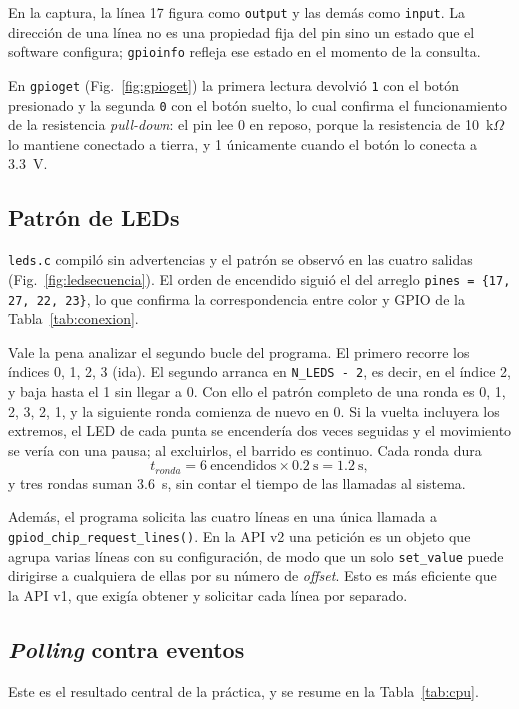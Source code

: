 \documentclass[conference]{IEEEtran}
\begin{document}
En la captura, la línea 17 figura como \texttt{output} y las demás como \texttt{input}. La dirección de una línea no es una propiedad fija del pin sino un estado que el software configura; \texttt{gpioinfo} refleja ese estado en el momento de la consulta.

En \texttt{gpioget} (Fig.~\ref{fig:gpioget}) la primera lectura devolvió \texttt{1} con el botón presionado y la segunda \texttt{0} con el botón suelto, lo cual confirma el funcionamiento de la resistencia \textit{pull-down}: el pin lee 0 en reposo, porque la resistencia de 10~k$\Omega$ lo mantiene conectado a tierra, y 1 únicamente cuando el botón lo conecta a 3.3~V.

\subsection{Patrón de LEDs}
\texttt{leds.c} compiló sin advertencias y el patrón se observó en las cuatro salidas (Fig.~\ref{fig:ledsecuencia}). El orden de encendido siguió el del arreglo \texttt{pines = \{17, 27, 22, 23\}}, lo que confirma la correspondencia entre color y GPIO de la Tabla~\ref{tab:conexion}.

Vale la pena analizar el segundo bucle del programa. El primero recorre los índices 0, 1, 2, 3 (ida). El segundo arranca en \texttt{N\_LEDS - 2}, es decir, en el índice 2, y baja hasta el 1 sin llegar a 0. Con ello el patrón completo de una ronda es 0, 1, 2, 3, 2, 1, y la siguiente ronda comienza de nuevo en 0. Si la vuelta incluyera los extremos, el LED de cada punta se encendería dos veces seguidas y el movimiento se vería con una pausa; al excluirlos, el barrido es continuo. Cada ronda dura
\begin{equation}
	t_{ronda} = 6~\text{encendidos} \times 0.2~\text{s} = 1.2~\text{s},
\end{equation}
y tres rondas suman 3.6~s, sin contar el tiempo de las llamadas al sistema.

Además, el programa solicita las cuatro líneas en una única llamada a \texttt{gpiod\_chip\_request\_lines()}. En la API v2 una petición es un objeto que agrupa varias líneas con su configuración, de modo que un solo \texttt{set\_value} puede dirigirse a cualquiera de ellas por su número de \textit{offset}. Esto es más eficiente que la API v1, que exigía obtener y solicitar cada línea por separado.

\subsection{\textit{Polling} contra eventos}
Este es el resultado central de la práctica, y se resume en la Tabla~\ref{tab:cpu}.
\end{document}

